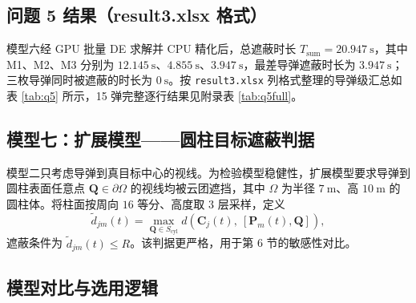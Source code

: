 \documentclass[11pt,a4paper]{ctexart}
\begin{document}
\subsection{问题 5 结果（result3.xlsx 格式）}

模型六经 GPU 批量 DE 求解并 CPU 精化后，总遮蔽时长 $T_{\mathrm{sum}}=20.947~\mathrm{s}$，其中 M1、M2、M3 分别为 $12.145~\mathrm{s}$、$4.855~\mathrm{s}$、$3.947~\mathrm{s}$，最差导弹遮蔽时长为 $3.947~\mathrm{s}$；三枚导弹同时被遮蔽的时长为 $0~\mathrm{s}$。按 \texttt{result3.xlsx} 列格式整理的导弹级汇总如表 \ref{tab:q5} 所示，15 弹完整逐行结果见附录表 \ref{tab:q5full}。

\begin{table}[H]
\centering
\caption{问题 5 各导弹遮蔽时长汇总（result3.xlsx 格式）}
\label{tab:q5}
\end{table}

\subsection{模型七：扩展模型——圆柱目标遮蔽判据}

模型二只考虑导弹到真目标中心的视线。为检验模型稳健性，扩展模型要求导弹到圆柱表面任意点 $\bm{Q}\in\partial\Omega$ 的视线均被云团遮挡，其中 $\Omega$ 为半径 $7~\mathrm{m}$、高 $10~\mathrm{m}$ 的圆柱体。将柱面按周向 $16$ 等分、高度取 $3$ 层采样，定义
\begin{equation}
  \tilde{d}_{jm}(t)=\max_{\bm{Q}\in S_{\mathrm{cyl}}} d(\bm{C}_j(t),\ [\bm{P}_m(t),\bm{Q}]),
  \label{eq:cyl}
\end{equation}
遮蔽条件为 $\tilde{d}_{jm}(t)\le R$。该判据更严格，用于第 6 节的敏感性对比。

\subsection{模型对比与选用逻辑}
\end{document}
